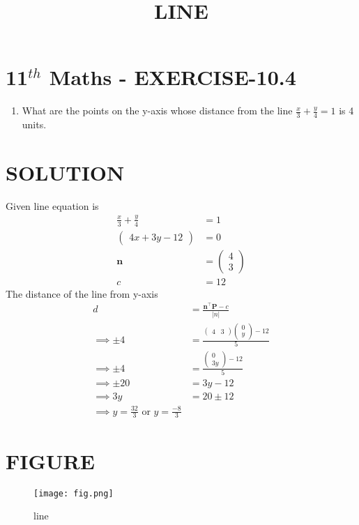 \documentclass[12pt]{article}
\newcommand{\myvec}[1]{\ensuremath{\begin{pmatrix}#1\end{pmatrix}}}
\providecommand{\abs}[1]{\left\vert#1\right\vert}
\let\vec\mathbf
\begin{document}
\begin{center}
\title{\textbf{LINE}}
\date{\vspace{-5ex}} %
\maketitle
\end{center}

\section{11$^{th}$ Maths - EXERCISE-10.4}
\begin{enumerate}
\item What are the points on the y-axis whose distance from the line $\frac{x}{3}+\frac{y}{4}=1$ is 4 units.
\end{enumerate}
\section{SOLUTION}
Given line equation is
\begin{align}
\frac{x}{3}+\frac{y}{4}&=1\\
\myvec{4x+3y-12}&=0\\
\vec{n}&=\myvec{4\\3}\\
c&=12
\end{align}
The distance of the line from y-axis
\begin{align}
d&=\frac{\vec{n}^\top\vec{P}-c}{\abs{n}}\\
\implies\pm4&=\frac{\myvec{4& 3}\myvec{0\\ y}-12}{5}\\
\implies\pm4&=\frac{\myvec{0\\ 3y}-12}{5}\\
\implies\pm20&=3y-12\\
\implies 3y&=20\pm12\\
\implies y= \frac{32}{3}\text{ or }y=\frac{-8}{3}
\end{align}

\section{FIGURE}
\begin{figure}[h]
\centering
\texttt{[image: fig.png]}
\caption{line}
		\label{fig:Figure}
\end{figure}
\end{document}
